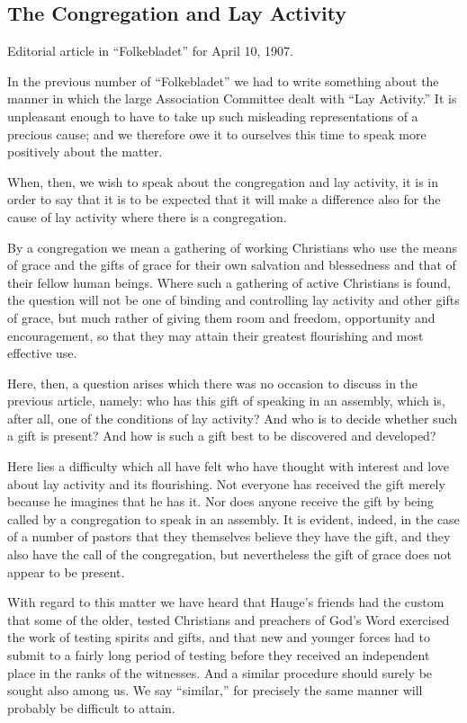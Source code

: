 


\subsection{The Congregation and Lay Activity}

Editorial article in “Folkebladet” for April 10, 1907.

In the previous number of “Folkebladet” we had to write something about the manner in which the large Association Committee dealt with “Lay Activity.” It is unpleasant enough to have to take up such misleading representations of a precious cause; and we therefore owe it to ourselves this time to speak more positively about the matter.

When, then, we wish to speak about the congregation and lay activity, it is in order to say that it is to be expected that it will make a difference also for the cause of lay activity where there is a congregation.

By a congregation we mean a gathering of working Christians who use the means of grace and the gifts of grace for their own salvation and blessedness and that of their fellow human beings. Where such a gathering of active Christians is found, the question will not be one of binding and controlling lay activity and other gifts of grace, but much rather of giving them room and freedom, opportunity and encouragement, so that they may attain their greatest flourishing and most effective use.

Here, then, a question arises which there was no occasion to discuss in the previous article, namely: who has this gift of speaking in an assembly, which is, after all, one of the conditions of lay activity? And who is to decide whether such a gift is present? And how is such a gift best to be discovered and developed?

Here lies a difficulty which all have felt who have thought with interest and love about lay activity and its flourishing. Not everyone has received the gift merely because he imagines that he has it. Nor does anyone receive the gift by being called by a congregation to speak in an assembly. It is evident, indeed, in the case of a number of pastors that they themselves believe they have the gift, and they also have the call of the congregation, but nevertheless the gift of grace does not appear to be present.

With regard to this matter we have heard that Hauge’s friends had the custom that some of the older, tested Christians and preachers of God’s Word exercised the work of testing spirits and gifts, and that new and younger forces had to submit to a fairly long period of testing before they received an independent place in the ranks of the witnesses. And a similar procedure should surely be sought also among us. We say “similar,” for precisely the same manner will probably be difficult to attain.


